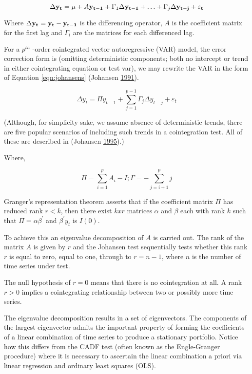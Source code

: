 \documentclass[12pt,]{article}
\begin{document}
\[
\label{eqn:vecm-differenced}
\Delta {\bf y_t} = {\bf \mu} + A {\bf y_{t-1}} + \Gamma_1 \Delta {\bf y_{t-1}} + \ldots + \Gamma_j \Delta {\bf y_{t-j}} + {\bf \varepsilon_t} 
\]

Where \(\Delta {\bf y_t} = {\bf y_t} - {\bf y_{t-1}}\) is the differencing operator, \(A\) is the coefficient matrix for the first lag and \(\Gamma_i\) are the matrices for each differenced lag.

For a \(p^{th}\) -order cointegrated vector autoregressive (VAR) model, the error correction form is (omitting deterministic components; both no intercept or trend in either cointegrating equation or test var), we may rewrite the VAR in the form of Equation \ref{eqn:johansens} (Johansen \protect\hyperlink{ref-johansen1991estimation}{1991}).

\[
\label{eqn:johansens}
\Delta y_t = \Pi y_{t-1} + \sum_{j = 1}^{p-1} {\Gamma_j \Delta y_{t-j}} + \varepsilon_t
\]

(Although, for simplicity sake, we assume absence of deterministic trends, there are five popular scenarios of including such trends in a cointegration test. All of these are described in (Johansen \protect\hyperlink{ref-johansen1995identifying}{1995}).)

Where,

\[
\Pi = \sum^{p}_{i = 1}{A_{i}-I}; \Gamma = -\sum^{p}_{j = i + 1}{j}
\]

Granger's representation theorem asserts that if the coefficient matrix \(\Pi\) has reduced rank \(r < k\), then there exist \(kxr\) matrices \(\alpha\) and \(\beta\) each with rank \(k\) such that \(\Pi = \alpha \beta^{\prime}\) and \(\beta^{\prime}y_t\) is \(I(0)\).

To achieve this an eigenvalue decomposition of \(A\) is carried out. The rank of the matrix \(A\) is given by \(r\) and the Johansen test sequentially tests whether this rank \(r\) is equal to zero, equal to one, through to \(r=n-1\), where \(n\) is the number of time series under test.

The null hypothesis of \(r=0\) means that there is no cointegration at all. A rank \(r > 0\) implies a cointegrating relationship between two or possibly more time series.

The eigenvalue decomposition results in a set of eigenvectors. The components of the largest eigenvector admits the important property of forming the coefficients of a linear combination of time series to produce a stationary portfolio. Notice how this differs from the CADF test (often known as the Engle-Granger procedure) where it is necessary to ascertain the linear combination a priori via linear regression and ordinary least squares (OLS).
\end{document}
